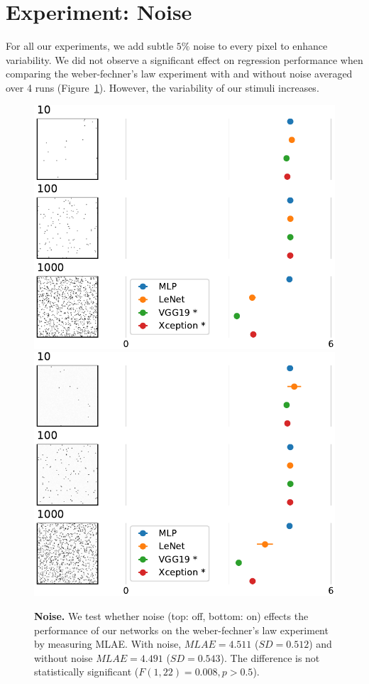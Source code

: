 \documentclass[journal]{vgtc}                %
\begin{document}
\section{Experiment: Noise}
For all our experiments, we add subtle $5\%$ noise to every pixel to enhance variability. We did not observe a significant effect on regression performance when comparing the weber-fechner's law experiment with and without noise averaged over 4 runs (Figure~\ref{fig:noise}). However, the variability of our stimuli increases.

\begin{figure}[th]
\centering
\includegraphics[width=.8\linewidth]{../gfx/weber_mlae_no_noise.pdf}
\includegraphics[width=.8\linewidth]{../gfx/weber_mlae_noise.pdf}
\caption{\textbf{Noise.} We test whether noise (top: off, bottom: on) effects the performance of our networks on the weber-fechner's law experiment by measuring MLAE. With noise, $MLAE=4.511$ ($SD=0.512$) and without noise $MLAE=4.491$ ($SD=0.543$). The difference is not statistically significant ($F(1,22)=0.008,p>0.5$).}
\label{fig:noise}
\end{figure}
\end{document}

